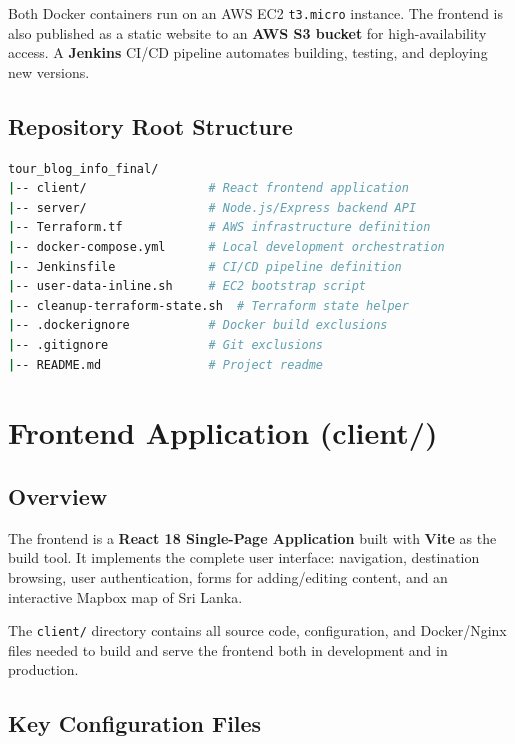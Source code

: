 \documentclass[12pt,a4paper]{report}
\begin{document}
Both Docker containers run on an AWS EC2 \texttt{t3.micro} instance. The frontend is also published as a static website to an \textbf{AWS S3 bucket} for high-availability access. A \textbf{Jenkins} CI/CD pipeline automates building, testing, and deploying new versions.

\section{Repository Root Structure}

\begin{lstlisting}[language=bash, caption={Top-level directory layout}]
tour_blog_info_final/
|-- client/                 # React frontend application
|-- server/                 # Node.js/Express backend API
|-- Terraform.tf            # AWS infrastructure definition
|-- docker-compose.yml      # Local development orchestration
|-- Jenkinsfile             # CI/CD pipeline definition
|-- user-data-inline.sh     # EC2 bootstrap script
|-- cleanup-terraform-state.sh  # Terraform state helper
|-- .dockerignore           # Docker build exclusions
|-- .gitignore              # Git exclusions
|-- README.md               # Project readme
\end{lstlisting}

\chapter{Frontend Application (client/)}

\section{Overview}

The frontend is a \textbf{React 18 Single-Page Application} built with \textbf{Vite} as the build tool. It implements the complete user interface: navigation, destination browsing, user authentication, forms for adding/editing content, and an interactive Mapbox map of Sri Lanka.

The \texttt{client/} directory contains all source code, configuration, and Docker/Nginx files needed to build and serve the frontend both in development and in production.

\section{Key Configuration Files}
\end{document}
